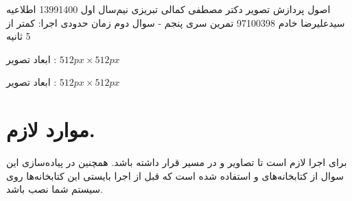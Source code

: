 \documentclass[a4paper,12pt]{article}
\begin{document}
	\handout
	{اصول پردازش تصویر}
	{دکتر مصطفی کمالی تبریزی}
	{نیم‌سال اول 1399\lr{-}1400}
	{اطلاعیه}
	{سیدعلیرضا خادم}
	{97100398}
	{تمرین سری پنجم - سوال دوم}
	زمان حدودی اجرا: کمتر از 5 ثانیه 
	
	ابعاد تصویر
	:
	$ 512{px} \times 512{px} $
	
	ابعاد تصویر
	:
	$ 512{px} \times 512{px} $
	
	\section*{موارد لازم.}
	برای اجرا لازم است تا تصاویر 
	و
	در مسیر
	قرار داشته باشد. همچنین در پیاده‌سازی این سوال از کتابخانه‌های 
	و
	استفاده شده است که قبل از اجرا بایستی این کتابخانه‌ها روی سیستم شما نصب باشد.
\end{document}
